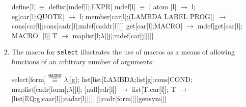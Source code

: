 \documentclass{tufte-handout}
\begin{document}
\begin{enumerate}
  \begin{mexp}
    define[l] $\equiv$ deflist[mdef[l];EXPR]
    mdef[l] $\equiv$ [
            atom [l] $\rightarrow$ l;
            eg[car[l];QUOTE] $\rightarrow$ l;
            member[car[l];(LAMBDA LABEL PROG)] $\rightarrow$
                cons[car[l];cons[cadr[l];mdef[caddr[l]]]]
            get[car[l];MACRO] $\rightarrow$ mdef[get[car[l]; MACRO]
        [l]]
            T $\rightarrow$ maplist[l;$\lambda$[[j];mdef[car[j]]]]]
  \end{mexp}
\item The macro for \texttt{select} illustrates the use of macros as a means of
  allowing functions of an arbitrary number of arguments:
  \begin{mexp}
    select[form] $\overset{\mathtt{MACRO}}{\mathbf{\equiv}}{}$ $\lambda$[[g];
        list[list[LAMBDA;list[g];cons[COND;
            maplist[cadr[form];$\lambda$[[l];
                [null[cdr[l]] $\rightarrow$ list[T;car[l]];
                    T $\rightarrow$ [list[EQ;g;caar[l]];cadar[l]]]]]
            ]];cadr[form]]][gensym[]]
  \end{mexp}
  
\end{enumerate}
\end{document}
